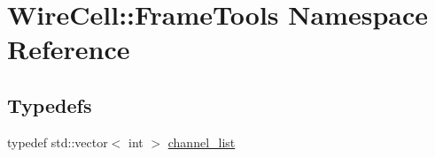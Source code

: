 \hypertarget{namespace_wire_cell_1_1_frame_tools}{}\section{Wire\+Cell\+:\+:Frame\+Tools Namespace Reference}
\label{namespace_wire_cell_1_1_frame_tools}
\subsection*{Typedefs}
\begin{DoxyCompactItemize}
\item 
typedef std\+::vector$<$ int $>$ \hyperlink{namespace_wire_cell_1_1_frame_tools_aaf07539dac296588f9004b525f940e67}{channel\+\_\+list}
\end{DoxyCompactItemize}
